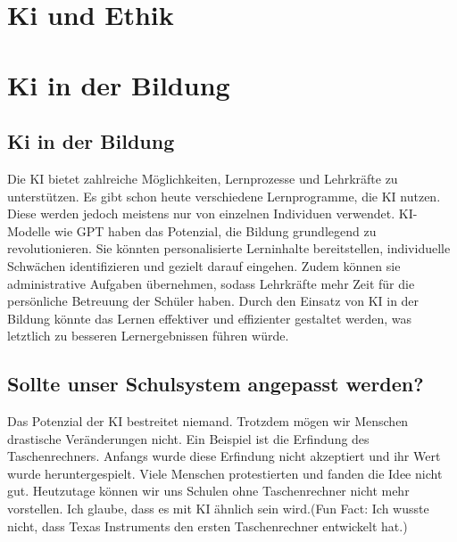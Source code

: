 \documentclass{report}
\begin{document}
\chapter{Ki und Ethik}

\chapter{Ki in der Bildung}





\section{Ki in der Bildung}
Die KI bietet zahlreiche Möglichkeiten, Lernprozesse und Lehrkräfte zu unterstützen. Es gibt schon heute verschiedene Lernprogramme, die KI nutzen. Diese werden jedoch meistens nur von einzelnen Individuen verwendet. KI-Modelle wie GPT haben das Potenzial, die Bildung grundlegend zu revolutionieren. Sie könnten personalisierte Lerninhalte bereitstellen, individuelle Schwächen identifizieren und gezielt darauf eingehen. Zudem können sie administrative Aufgaben übernehmen, sodass Lehrkräfte mehr Zeit für die persönliche Betreuung der Schüler haben. Durch den Einsatz von KI in der Bildung könnte das Lernen effektiver und effizienter gestaltet werden, was letztlich zu besseren Lernergebnissen führen würde.
\section{Sollte unser Schulsystem angepasst werden?}
Das Potenzial der KI bestreitet niemand. Trotzdem mögen wir Menschen drastische Veränderungen nicht. Ein Beispiel ist die Erfindung des Taschenrechners. Anfangs wurde diese Erfindung nicht akzeptiert und ihr Wert wurde heruntergespielt. Viele Menschen protestierten und fanden die Idee nicht gut. Heutzutage können wir uns Schulen ohne Taschenrechner nicht mehr vorstellen. Ich glaube, dass es mit KI ähnlich sein wird.(Fun Fact: Ich wusste nicht, dass Texas Instruments den ersten Taschenrechner entwickelt hat.)
\end{document}
